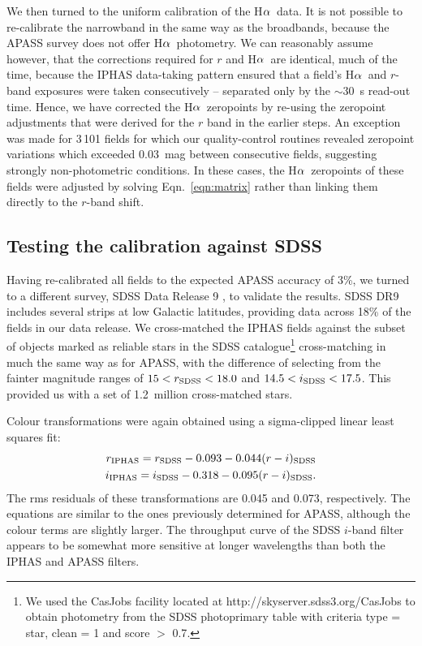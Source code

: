 \documentclass[useAMS,usenatbib]{mn2e}
\def\ha{\mbox{H$\rm \alpha$}}
\begin{document}
We then turned to the uniform calibration of the \ha\ data.
It is not possible to re-calibrate the narrowband 
in the same way as the broadbands,
because the APASS survey does not offer \ha\ photometry.
We can reasonably assume however,
that the corrections required for $r$ and \ha\ are identical,
much of the time, because the IPHAS data-taking pattern ensured 
that a field's \ha\ and $r$-band exposures
were taken consecutively -- 
separated only by the $\sim$30~s read-out time.
Hence, we have corrected the \ha\ zeropoints 
by re-using the zeropoint adjustments that were derived for the $r$ band
in the earlier steps.
An exception was made for 3\,101 fields
for which our quality-control routines revealed
zeropoint variations which exceeded 0.03~mag 
between consecutive fields,
suggesting strongly non-photometric conditions.
In these cases, the \ha\ zeropoints of these fields
were adjusted by solving Eqn.~\ref{eqn:matrix}
rather than linking them directly to the $r$-band shift.

\subsection{Testing the calibration against SDSS}

Having re-calibrated all fields to the expected APASS accuracy of 3\%,
we turned to a different survey, SDSS Data Release 9 \citep{Ahn2012},
to validate the results.
SDSS DR9 includes several strips at low
Galactic latitudes,
providing data across 18\% of the fields in our data release.
We cross-matched the IPHAS fields against the subset of
objects marked as reliable stars in the SDSS catalogue\footnote{
We used the CasJobs facility located at http://skyserver.sdss3.org/CasJobs
to obtain photometry from the SDSS {\sc photoprimary} table 
with criteria {\sc type = star}, {\sc clean = 1} and {\sc score $>$ 0.7}.}
cross-matching in much the same way as for APASS,
with the difference of selecting from the  fainter magnitude ranges of 
$15<r_{\rm SDSS}<18.0$ and $14.5<i_{\rm SDSS}<17.5$.
This provided us with a set of 1.2~million cross-matched stars.

Colour transformations were again obtained using a sigma-clipped linear least squares fit:
\begin{eqnarray}
r_{\rm IPHAS} = r_{\rm SDSS} - 0.093 - 0.044(r-i)_{\rm SDSS} \label{eqn:sdss_r} \\
i_{\rm IPHAS} = i_{\rm SDSS} - 0.318 - 0.095(r-i)_{\rm SDSS}. \label{eqn:sdss_i}
\end{eqnarray}
The rms residuals of these transformations are 0.045 and 0.073, respectively.
The equations are similar to the ones
previously determined for APASS,
although the colour terms are slightly larger.
The throughput curve of the SDSS $i$-band filter 
appears to be somewhat more sensitive at longer wavelengths
than both the IPHAS and APASS filters.
\end{document}
